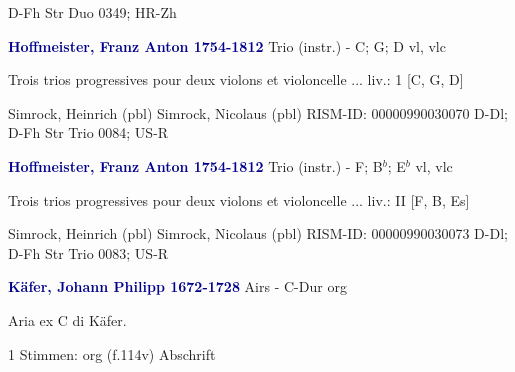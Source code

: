 \documentclass[twocolumn]{book}
\begin{document}
\newline D-Fh  Str Duo 0349; HR-Zh
\newline \par \vspace{7pt} \textcolor{darkblue}{\textbf{Hoffmeister, Franz Anton  1754-1812}}
\newline Trio (instr.) - C; G; D
 vl, vlc
\newline \begin{itshape}Trois trios progressives pour deux violons et violoncelle ... liv.: 1 [C, G, D]\end{itshape} 
\newline Simrock, Heinrich  (pbl)
\newline Simrock, Nicolaus  (pbl)
\newline RISM-ID: 00000990030070
\newline D-Dl; D-Fh  Str Trio 0084; US-R
\newline \par \vspace{7pt} \textcolor{darkblue}{\textbf{Hoffmeister, Franz Anton  1754-1812}}
\newline Trio (instr.) - F; B$^b$; E$^b$
 vl, vlc
\newline \begin{itshape}Trois trios progressives pour deux violons et violoncelle ... liv.: II [F, B, Es]\end{itshape} 
\newline Simrock, Heinrich  (pbl)
\newline Simrock, Nicolaus  (pbl)
\newline RISM-ID: 00000990030073
\newline D-Dl; D-Fh  Str Trio 0083; US-R
\newline \par \vspace{7pt} \textcolor{darkblue}{\textbf{Käfer, Johann Philipp  1672-1728}}
\newline Airs - C-Dur
\newline org
\newline \begin{itshape}[f.114v, heading:] Aria ex C di Käfer.\end{itshape} 
\newline \textcolor{darkblue}{}  1 Stimmen: org  (f.114v)
\newline Abschrift
\end{document}
